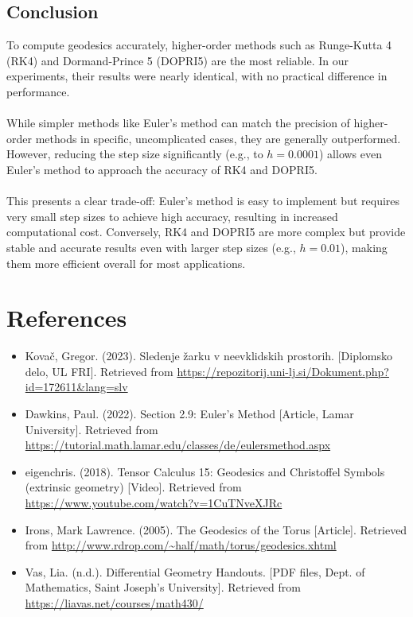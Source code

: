 \documentclass{article}
\begin{document}
	\subsection{Conclusion}
	To compute geodesics accurately, higher-order methods such as Runge-Kutta 4 (RK4) and Dormand-Prince 5 (DOPRI5) are the most reliable. In our experiments, their results were nearly identical, with no practical difference in performance.
	\\\\
	While simpler methods like Euler's method can match the precision of higher-order methods in specific, uncomplicated cases, they are generally outperformed. However, reducing the step size significantly (e.g., to \(h = 0.0001\)) allows even Euler’s method to approach the accuracy of RK4 and DOPRI5.
	\\\\
	This presents a clear trade-off: Euler’s method is easy to implement but requires very small step sizes to achieve high accuracy, resulting in increased computational cost. Conversely, RK4 and DOPRI5 are more complex but provide stable and accurate results even with larger step sizes (e.g., \(h = 0.01\)), making them more efficient overall for most applications.

	
	
	\newpage
	\section{References}
	
	\begin{itemize}
		\item Kovač, Gregor. (2023). Sledenje žarku v neevklidskih prostorih. [Diplomsko delo, UL FRI]. Retrieved from \url{https://repozitorij.uni-lj.si/Dokument.php?id=172611&lang=slv}
		
		\item Dawkins, Paul. (2022). Section 2.9: Euler's Method [Article, Lamar University]. Retrieved from \url{https://tutorial.math.lamar.edu/classes/de/eulersmethod.aspx}
				
		\item eigenchris. (2018). Tensor Calculus 15: Geodesics and Christoffel Symbols (extrinsic geometry) [Video]. Retrieved from \url{https://www.youtube.com/watch?v=1CuTNveXJRc}
		
		
		\item Irons, Mark Lawrence. (2005). The Geodesics of the Torus [Article]. Retrieved from \url{http://www.rdrop.com/~half/math/torus/geodesics.xhtml}
		
		\item Vas, Lia. (n.d.). Differential Geometry Handouts. [PDF files, Dept. of Mathematics, Saint Joseph's University]. Retrieved from \url{https://liavas.net/courses/math430/}
	\end{itemize}
	
	
\end{document}
